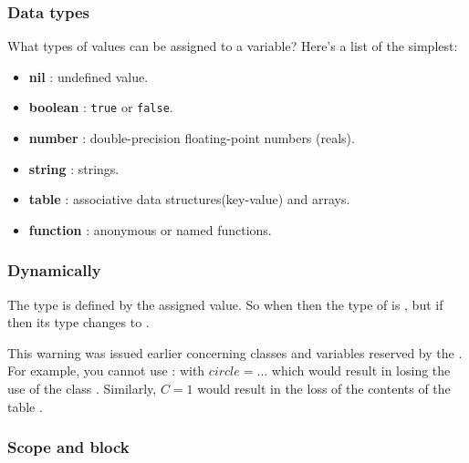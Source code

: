 \subsubsection{Data types}
\label{ssub:types}
 What types of values can be assigned to a variable? Here's a list of the simplest:

\begin{itemize}
    \item \textbf{nil} : undefined value.
    \item \textbf{boolean} : \texttt{true} or \texttt{false}.
    \item \textbf{number} : double-precision floating-point numbers (reals).
    \item \textbf{string} : strings.
    \item \textbf{table} : associative data structures(key-value) and arrays.
    \item \textbf{function} : anonymous or named functions.
\end{itemize}

\subsubsection{Dynamically}

The type is defined by the assigned value. So when  then the type of  is , but if  then its type changes to .

\tkzRBomb This warning was issued earlier concerning classes and variables reserved by the . For example, you cannot use :  with $circle = ...$ which would result in losing the use of the class . Similarly, $C= 1$ would result in the loss of the contents of the table .

\subsubsection{Scope and block}


